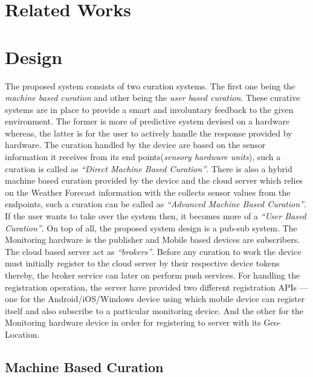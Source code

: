 \documentclass[10pt]{article}
\begin{document}
\section*{Related Works}



\section*{Design}

The proposed system consists of two curation systems. The first one being the \emph{machine based curation} and other being the \emph{user based curation}. These curative systems are in place to provide a smart and involuntary feedback to the given environment. The former is more of predictive system devised on a hardware whereas, the latter is for the user to actively handle the response provided by hardware. The curation handled by the device are based on the sensor information it receives from its end points(\emph{sensory hardware units}), such a curation is called as \emph{``Direct Machine Based Curation''}. There is also a hybrid machine based curation provided by the device and the cloud server which relies on the Weather Forecast information with the collects sensor values from the endpoints, such a curation can be called as \emph{``Advanced Machine Based Curation''}. If the user wants to take over the system then, it becomes more of a \emph{``User Based Curation''}. On top of all, the proposed system design is a pub-sub system. The Monitoring hardware is the publisher and Mobile based devices are subscribers. The cloud based server act as \emph{``brokers''}. Before any curation to work the device must initially register to the cloud server by their respective device tokens thereby, the broker service can later on perform push services. For handling the registration operation, the server have provided two different registration APIs --- one for the Android/iOS/Windows device using which mobile device can register itself and also subscribe to a particular monitoring device. And the other for the Monitoring hardware device in order for registering to server with its Geo-Location.

\subsection*{Machine Based Curation}
\end{document}
